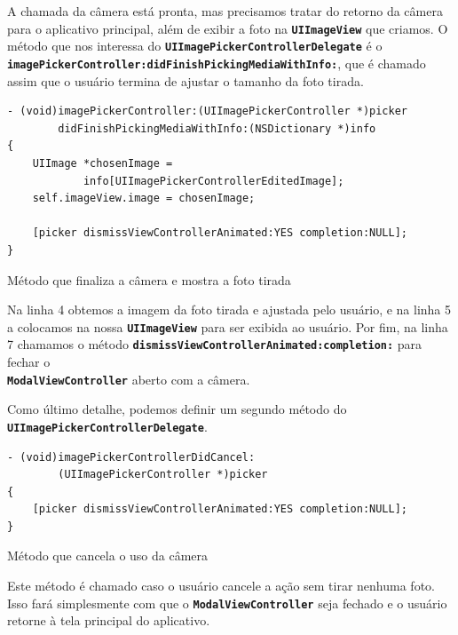 \documentclass[a4paper,12pt,brazil,doubleside]{book}
\begin{document}
\begin{singlespace}
A chamada da câmera está pronta, mas precisamos tratar do retorno da câmera para o aplicativo principal, além de exibir a foto na \texttt{\textbf{UIImageView}} que criamos. O método que nos interessa do \texttt{\textbf{UIImagePickerControllerDelegate}} é o\\ \texttt{\textbf{imagePickerController:didFinishPickingMediaWithInfo:}}, que é chamado assim que o usuário termina de ajustar o tamanho da foto tirada.

\begin{listing}[H]
\begin{verbatim}
- (void)imagePickerController:(UIImagePickerController *)picker
        didFinishPickingMediaWithInfo:(NSDictionary *)info
{
    UIImage *chosenImage =
            info[UIImagePickerControllerEditedImage];
    self.imageView.image = chosenImage;
    
    [picker dismissViewControllerAnimated:YES completion:NULL];
}
\end{verbatim}
\caption{Método que finaliza a câmera e mostra a foto tirada}
\end{listing}


Na linha 4 obtemos a imagem da foto tirada e ajustada pelo usuário, e na linha 5 a colocamos na nossa \texttt{\textbf{UIImageView}} para ser exibida ao usuário. Por fim, na linha 7 chamamos o método \texttt{\textbf{dismissViewControllerAnimated:completion:}} para fechar o\\ \texttt{\textbf{ModalViewController}} aberto com a câmera.

Como último detalhe, podemos definir um segundo método do\\ \texttt{\textbf{UIImagePickerControllerDelegate}}.

\begin{listing}[H]
\begin{verbatim}
- (void)imagePickerControllerDidCancel:
        (UIImagePickerController *)picker
{
    [picker dismissViewControllerAnimated:YES completion:NULL];
}
\end{verbatim}
\caption{Método que cancela o uso da câmera}
\end{listing}


Este método é chamado caso o usuário cancele a ação sem tirar nenhuma foto. Isso fará simplesmente com que o \texttt{\textbf{ModalViewController}} seja fechado e o usuário retorne à tela principal do aplicativo.


\end{singlespace}
\end{document}
